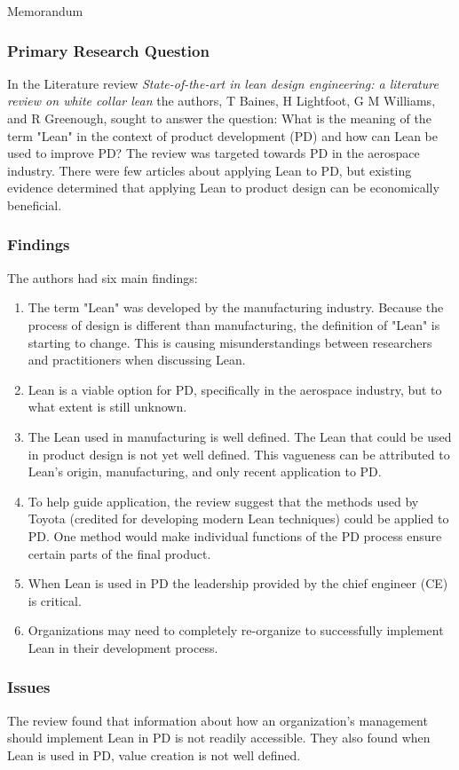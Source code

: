 \documentclass[letterpaper,13pt]{texMemo}
\begin{document}
\singlespace
\begin{center}
\large {Memorandum}
\end{center}
\setlength{\topmargin}{0in}
\maketitle
\subsubsection*{Primary Research Question}
\noindent
In the Literature review \emph{State-of-the-art in lean design engineering: a literature review on
white collar lean} the authors, T Baines, H Lightfoot, G M Williams, and R Greenough, sought to answer the
question: What is the meaning of the term "Lean" in the context of product development (PD) and how
can Lean be used to improve PD? The review was targeted
towards PD in the aerospace industry. There were few articles about applying Lean to PD, but
existing evidence determined that applying Lean to product design can be economically beneficial.

\subsubsection*{Findings}
The authors had six main findings:
\begin{enumerate}
\item
The term "Lean" was developed by the manufacturing industry. Because the process of design
is different than manufacturing, the definition of "Lean" is starting to change. This is causing
misunderstandings between researchers and practitioners when discussing Lean.

\item
Lean is a viable option for PD, specifically in the aerospace industry, but to what
extent is still unknown.

\item
The Lean used in manufacturing is well defined. The Lean that could be used in product
design is not yet well defined. This vagueness can be attributed to Lean's origin, manufacturing, and
only recent application to PD.

\item
To help guide application, the review suggest that the methods used by Toyota (credited for
developing modern Lean techniques) could be applied to PD. One method would make individual
functions of the PD process ensure certain parts of the final product.

\item
When Lean is used in PD the leadership provided by the chief engineer (CE) is critical.

\item
Organizations may need to completely re-organize to successfully implement Lean in their development
process.
\end{enumerate}

\subsubsection*{Issues}
\noindent
The review found that information about how an organization's management should implement Lean in
PD is not readily accessible. They also found when Lean is used in PD, value creation is not well defined.
\end{document}

